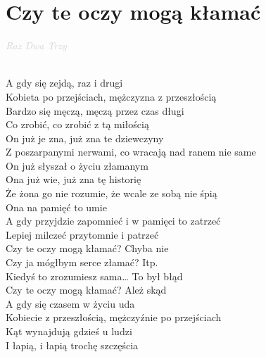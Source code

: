 \documentclass[a5paper, 10pt]{book}
\begin{document}
\newpage
\section{Czy te oczy mogą kłamać}\textcolor{lightgray}{\textit{Raz Dwa Trzy}}\\~\\
\begin{minipage}[t]{0.85\textwidth}
  A gdy się zejdą, raz i drugi\\
  Kobieta po przejściach, mężczyzna z przeszłością\\
  Bardzo się męczą, męczą przez czas długi\\
  Co zrobić, co zrobić z tą miłością\\

  \hspace*{1mm} On już je zna, już zna te dziewczyny\\
  \hspace*{1mm} Z poszarpanymi nerwami, co wracają nad ranem nie same\\
  \hspace*{1mm} On już słyszał o życiu złamanym\\

  \hspace*{1mm} Ona już wie, już zna tę historię\\
  \hspace*{1mm} Że żona go nie rozumie, że wcale ze sobą nie śpią\\
  \hspace*{1mm} Ona na pamięć to umie\\

  \hspace*{4mm} A gdy przyjdzie zapomnieć i w pamięci to zatrzeć\\
  \hspace*{4mm} Lepiej milczeć przytomnie i patrzeć\\
  \hspace*{6mm} Czy te oczy mogą kłamać? Chyba nie\\
  \hspace*{6mm} Czy ja mógłbym serce złamać? Itp.\\
  \hspace*{6mm} Kiedyś to zrozumiesz sama… To był błąd\\
  \hspace*{6mm} Czy te oczy mogą kłamać? Ależ skąd\\

  A gdy się czasem w życiu uda\\
  Kobiecie z przeszłością, mężczyźnie po przejściach\\
  Kąt wynajdują gdzieś u ludzi\\
  I łapią, i łapią trochę szczęścia\\


\end{minipage}
\end{document}

